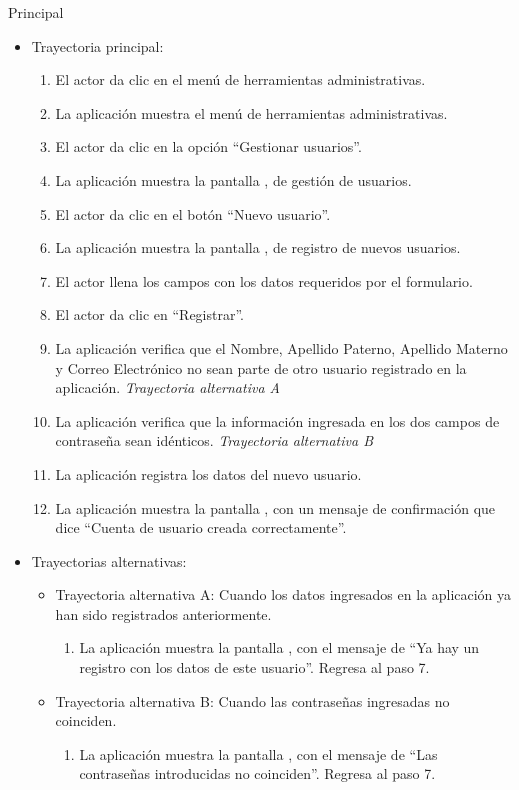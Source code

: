\begin{UCtrayectoria}{Principal}
			\begin{itemize}
				\item Trayectoria principal:
					\begin{enumerate}
						\item El actor da clic en el menú de herramientas administrativas.
						\item La aplicación muestra el menú de herramientas administrativas.
						\item El actor da clic en la opción ``Gestionar usuarios''.
						\item La aplicación muestra la pantalla , de gestión de usuarios.
						\item El actor da clic en el botón ``Nuevo usuario''.
						\item La aplicación muestra la pantalla , de registro de nuevos usuarios.
						\item El actor llena los campos con los datos requeridos por el formulario.
						\item El actor da clic en ``Registrar''.
						\item La aplicación verifica que el Nombre, Apellido Paterno, Apellido Materno y Correo Electrónico no sean parte de otro usuario registrado en la aplicación. \textsl{Trayectoria alternativa A}
						\item La aplicación verifica que la información ingresada en los dos campos de contraseña sean idénticos. \textsl{Trayectoria alternativa B}
						\item La aplicación registra los datos del nuevo usuario.
						\item La aplicación muestra la pantalla , con un mensaje de confirmación que dice ``Cuenta de usuario creada correctamente''.
					\end{enumerate}
				\item Trayectorias alternativas:
					\begin{itemize}
						\item Trayectoria alternativa A: Cuando los datos ingresados en la aplicación ya han sido registrados anteriormente.
							\begin{enumerate}
								\item La aplicación muestra la pantalla , con el mensaje de ``Ya hay un registro con los datos de este usuario''. Regresa al paso 7.
							\end{enumerate}
						\item Trayectoria alternativa B: Cuando las contraseñas ingresadas no coinciden.
							\begin{enumerate}
								\item La aplicación muestra la pantalla , con el mensaje de ``Las contraseñas introducidas no coinciden''. Regresa al paso 7.
							\end{enumerate}
					\end{itemize}
			\end{itemize}


\end{UCtrayectoria}

